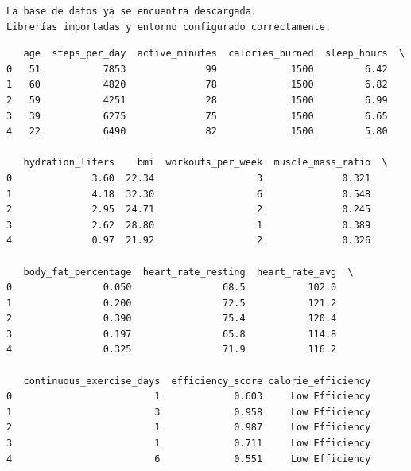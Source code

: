 \begin{lstlisting}
La base de datos ya se encuentra descargada.
Librerías importadas y entorno configurado correctamente.
\end{lstlisting}

\begin{lstlisting}
   age  steps_per_day  active_minutes  calories_burned  sleep_hours  \
0   51           7853              99             1500         6.42   
1   60           4820              78             1500         6.82   
2   59           4251              28             1500         6.99   
3   39           6275              75             1500         6.65   
4   22           6490              82             1500         5.80   

   hydration_liters    bmi  workouts_per_week  muscle_mass_ratio  \
0              3.60  22.34                  3              0.321   
1              4.18  32.30                  6              0.548   
2              2.95  24.71                  2              0.245   
3              2.62  28.80                  1              0.389   
4              0.97  21.92                  2              0.326   

   body_fat_percentage  heart_rate_resting  heart_rate_avg  \
0                0.050                68.5           102.0   
1                0.200                72.5           121.2   
2                0.390                75.4           120.4   
3                0.197                65.8           114.8   
4                0.325                71.9           116.2   

   continuous_exercise_days  efficiency_score calorie_efficiency  
0                         1             0.603     Low Efficiency  
1                         3             0.958     Low Efficiency  
2                         1             0.987     Low Efficiency  
3                         1             0.711     Low Efficiency  
4                         6             0.551     Low Efficiency  
\end{lstlisting}

